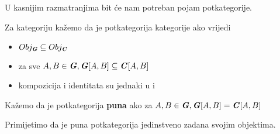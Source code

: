   U kasnijim razmatranjima bit će nam potreban pojam potkategorije.
  \begin{definition}
    Za kategoriju  kažemo da je potkategorija kategorije
     ako vrijedi
    \begin{itemize}
      \item $Obj_{\textbf{\emph{G}}} \subseteq Obj_{\textbf{\emph{C}}}$
      \item za sve $A, B \in \textbf{\emph{G}}, \textbf{\emph{G}}[A, B] \subseteq
        \textbf{\emph{C}}[A, B]$
      \item kompozicija i identitata su jednaki u  i 
    \end{itemize}
    Kažemo da je potkategorija \textbf{puna} ako za $A, B \in \textbf{\emph{G}},
    \textbf{\emph{G}}[A, B] = \textbf{\emph{C}}[A, B]$
  \end{definition}
  Primijetimo da je puna potkategorija jedinstveno zadana svojim objektima.
  \newpage
